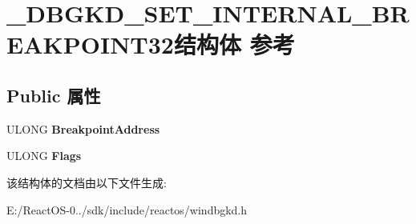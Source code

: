 \hypertarget{struct___d_b_g_k_d___s_e_t___i_n_t_e_r_n_a_l___b_r_e_a_k_p_o_i_n_t32}{}\section{\+\_\+\+D\+B\+G\+K\+D\+\_\+\+S\+E\+T\+\_\+\+I\+N\+T\+E\+R\+N\+A\+L\+\_\+\+B\+R\+E\+A\+K\+P\+O\+I\+N\+T32结构体 参考}
\label{struct___d_b_g_k_d___s_e_t___i_n_t_e_r_n_a_l___b_r_e_a_k_p_o_i_n_t32}
\subsection*{Public 属性}
\begin{DoxyCompactItemize}
\item 
\mbox{\label{struct___d_b_g_k_d___s_e_t___i_n_t_e_r_n_a_l___b_r_e_a_k_p_o_i_n_t32_a1a03536645b598ad57599ebb9699b1d6}} 
U\+L\+O\+NG {\bfseries Breakpoint\+Address}
\item 
\mbox{\label{struct___d_b_g_k_d___s_e_t___i_n_t_e_r_n_a_l___b_r_e_a_k_p_o_i_n_t32_a7784c7ee9ca0312a725ba57d5001b52d}} 
U\+L\+O\+NG {\bfseries Flags}
\end{DoxyCompactItemize}


该结构体的文档由以下文件生成\+:\begin{DoxyCompactItemize}
\item 
E\+:/\+React\+O\+S-\/0../sdk/include/reactos/windbgkd.\+h\end{DoxyCompactItemize}
